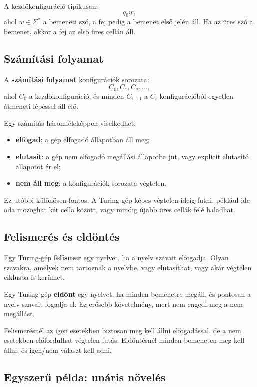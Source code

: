 A kezdőkonfiguráció tipikusan:
\[
  q_0 w,
\]
ahol $w\in\Sigma^\ast$ a bemeneti szó, a fej pedig a bemenet első jelén áll. Ha az üres szó a bemenet, akkor a fej az első üres cellán áll.

\subsection{Számítási folyamat}

A \textbf{számítási folyamat} konfigurációk sorozata:
\[
  C_0,C_1,C_2,\ldots,
\]
ahol $C_0$ a kezdőkonfiguráció, és minden $C_{i+1}$ a $C_i$ konfigurációból egyetlen átmeneti lépéssel áll elő.

Egy számítás háromféleképpen viselkedhet:

\begin{itemize}
  \item \textbf{elfogad}: a gép elfogadó állapotban áll meg;
  \item \textbf{elutasít}: a gép nem elfogadó megállási állapotba jut, vagy explicit elutasító állapotot ér el;
  \item \textbf{nem áll meg}: a konfigurációk sorozata végtelen.
\end{itemize}

Ez utóbbi különösen fontos. A Turing-gép képes végtelen ideig futni, például ide-oda mozoghat két cella között, vagy mindig újabb üres cellák felé haladhat.

\subsection{Felismerés és eldöntés}

Egy Turing-gép \textbf{felismer} egy nyelvet, ha a nyelv szavait elfogadja. Olyan szavakra, amelyek nem tartoznak a nyelvbe, vagy elutasíthat, vagy akár végtelen ciklusba is kerülhet.

Egy Turing-gép \textbf{eldönt} egy nyelvet, ha minden bemenetre megáll, és pontosan a nyelv szavait fogadja el. Ez erősebb követelmény, mert nem engedi meg a nem megállást.

\begin{summarybox}
Felismerésnél az igen esetekben biztosan meg kell állni elfogadással, de a nem esetekben előfordulhat végtelen futás. Eldöntésnél minden bemeneten meg kell állni, és igen/nem választ kell adni.
\end{summarybox}

\subsection{Egyszerű példa: unáris növelés}

